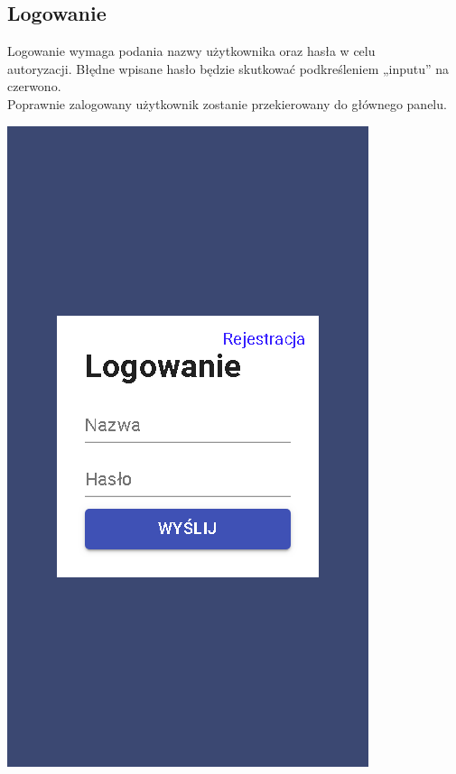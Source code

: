 \documentclass[12pt,a4paper]{article}  %
\begin{document}
		\subsection{Logowanie}
		Logowanie wymaga podania nazwy użytkownika oraz hasła w celu \\ autoryzacji.
		Błędne wpisane hasło będzie skutkować podkreśleniem „inputu” na czerwono. \\
		Poprawnie zalogowany użytkownik zostanie przekierowany do głównego panelu.
		\begin{center}
			\includegraphics[keepaspectratio,scale=0.65]{./img/login.PNG} \\[.8cm]
		\end{center}
		\newpage
\end{document}
